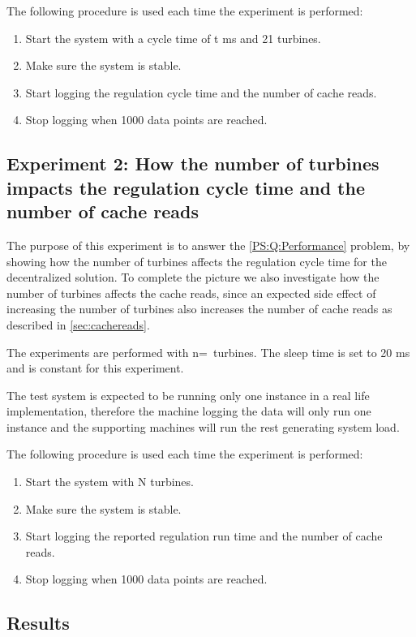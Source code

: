 The following procedure is used each time the experiment is performed:
\begin{enumerate}
	\item Start the system with a cycle time of t ms and 21 turbines.
	\item Make sure the system is stable.
	\item Start logging the regulation cycle time and the number of cache reads.
	\item Stop logging when 1000 data points are reached.
\end{enumerate}

\subsection{Experiment 2: How the number of turbines impacts the regulation cycle time and the number of cache reads}
\label{subsec:Exper:perfom:2}
The purpose of this experiment is to answer the \ref{PS:Q:Performance} problem, by showing how the number of turbines affects the regulation cycle time for the decentralized solution. To complete the picture we also investigate how the number of turbines affects the cache reads, since an expected side effect of increasing the number of turbines also increases the number of cache reads as described in \cref{sec:cachereads}.

The experiments are performed with n=\testTurbineNumbers ~turbines. The sleep time is set to 20 ms and is constant for this experiment.

The test system is expected to be running only one instance in a real life implementation, therefore the machine logging the data will only run one instance and the supporting machines will run the rest generating system load.

The following procedure is used each time the experiment is performed:
\begin{enumerate}
	\item Start the system with N turbines.
	\item Make sure the system is stable.
	\item Start logging the reported regulation run time and the number of cache reads.
	\item Stop logging when 1000 data points are reached.
\end{enumerate}


\subsection{Results}

